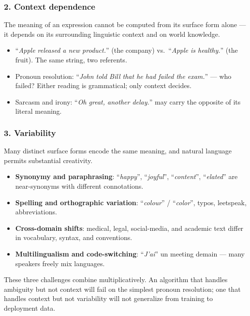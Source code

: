 \subsubsection*{2. Context dependence}

The meaning of an expression cannot be computed from its surface form alone --- it depends on its surrounding linguistic context and on world knowledge.

\begin{itemize}
    \item ``\emph{Apple released a new product.}'' (the company) vs.\ ``\emph{Apple is healthy.}'' (the fruit). The same string, two referents.
    \item Pronoun resolution: ``\emph{John told Bill that he had failed the exam.}'' --- who failed? Either reading is grammatical; only context decides.
    \item Sarcasm and irony: ``\emph{Oh great, another delay.}'' may carry the opposite of its literal meaning.
\end{itemize}

\subsubsection*{3. Variability}

Many distinct surface forms encode the same meaning, and natural language permits substantial creativity.

\begin{itemize}
    \item \textbf{Synonymy and paraphrasing}: ``\emph{happy}'', ``\emph{joyful}'', ``\emph{content}'', ``\emph{elated}'' are near-synonyms with different connotations.
    \item \textbf{Spelling and orthographic variation}: ``\emph{colour}'' / ``\emph{color}'', typos, leetspeak, abbreviations.
    \item \textbf{Cross-domain shifts}: medical, legal, social-media, and academic text differ in vocabulary, syntax, and conventions.
    \item \textbf{Multilingualism and code-switching}: ``\emph{J'ai}'' un meeting demain --- many speakers freely mix languages.
\end{itemize}

\begin{remark}
These three challenges combine multiplicatively. An algorithm that handles ambiguity but not context will fail on the simplest pronoun resolution; one that handles context but not variability will not generalize from training to deployment data.
\end{remark}

